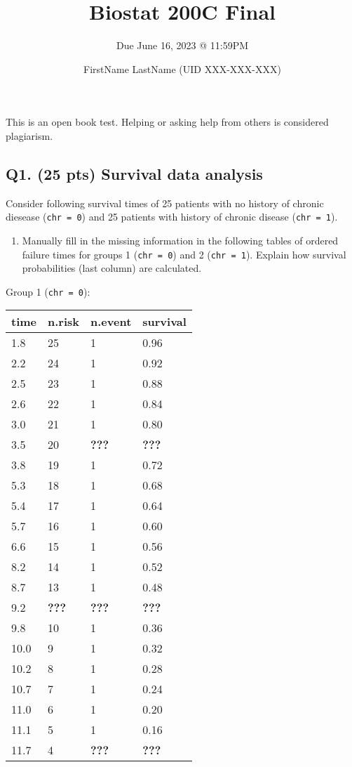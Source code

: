 \documentclass[
]{article}
\title{Biostat 200C Final}
\subtitle{Due June 16, 2023 @ 11:59PM}
\author{FirstName LastName (UID XXX-XXX-XXX)}
\date{}
\providecommand{\tightlist}{%
  \setlength{\itemsep}{0pt}\setlength{\parskip}{0pt}}
\begin{document}
\maketitle

{
\setcounter{tocdepth}{4}
\tableofcontents
}
This is an open book test. Helping or asking help from others is
considered plagiarism.

\hypertarget{q1.-25-pts-survival-data-analysis}{%
\subsection{Q1. (25 pts) Survival data
analysis}\label{q1.-25-pts-survival-data-analysis}}

Consider following survival times of 25 patients with no history of
chronic diesease (\texttt{chr\ =\ 0}) and 25 patients with history of
chronic disease (\texttt{chr\ =\ 1}).

\begin{enumerate}
\def\labelenumi{\arabic{enumi}.}
\tightlist
\item
  Manually fill in the missing information in the following tables of
  ordered failure times for groups 1 (\texttt{chr\ =\ 0}) and 2
  (\texttt{chr\ =\ 1}). Explain how survival probabilities (last column)
  are calculated.
\end{enumerate}

Group 1 (\texttt{chr\ =\ 0}):

\begin{longtable}[]{@{}llll@{}}
\toprule()
time & n.risk & n.event & survival \\
\midrule()
\endhead
1.8 & 25 & 1 & 0.96 \\
2.2 & 24 & 1 & 0.92 \\
2.5 & 23 & 1 & 0.88 \\
2.6 & 22 & 1 & 0.84 \\
3.0 & 21 & 1 & 0.80 \\
3.5 & 20 & \textbf{???} & \textbf{???} \\
3.8 & 19 & 1 & 0.72 \\
5.3 & 18 & 1 & 0.68 \\
5.4 & 17 & 1 & 0.64 \\
5.7 & 16 & 1 & 0.60 \\
6.6 & 15 & 1 & 0.56 \\
8.2 & 14 & 1 & 0.52 \\
8.7 & 13 & 1 & 0.48 \\
9.2 & \textbf{???} & \textbf{???} & \textbf{???} \\
9.8 & 10 & 1 & 0.36 \\
10.0 & 9 & 1 & 0.32 \\
10.2 & 8 & 1 & 0.28 \\
10.7 & 7 & 1 & 0.24 \\
11.0 & 6 & 1 & 0.20 \\
11.1 & 5 & 1 & 0.16 \\
11.7 & 4 & \textbf{???} & \textbf{???} \\
\bottomrule()
\end{longtable}
\end{document}
